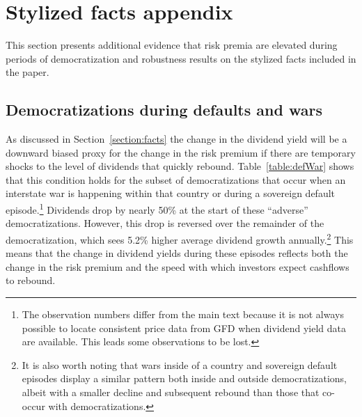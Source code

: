 
\section{Stylized facts appendix}\label{section:addSF}

This section presents additional evidence that risk premia are elevated during periods of democratization and robustness results on the stylized facts included in the paper.

\subsection{Democratizations during defaults and wars}\label{section:defWar}

As discussed in Section~\ref{section:facts} the change in the dividend yield will be a downward biased proxy for the change in the risk premium if there are temporary shocks to the level of dividends that quickly rebound. Table~\ref{table:defWar} shows that this condition holds for the subset of democratizations that occur when an interstate war is happening within that country or during a sovereign default episode.\footnote{The observation numbers differ from the main text because it is not always possible to locate consistent price data from GFD when dividend yield data are available. This leads some observations to be lost.} Dividends drop by nearly 50\% at the start of these ``adverse'' democratizations. However, this drop is reversed over the remainder of the democratization, which sees 5.2\% higher average dividend growth annually.\footnote{It is also worth noting that wars inside of a country and sovereign default episodes display a similar pattern both inside and outside democratizations, albeit with a smaller decline and subsequent rebound than those that co-occur with democratizations.} This means that the change in dividend yields during these episodes reflects both the change in the risk premium and the speed with which investors expect cashflows to rebound. 

 

